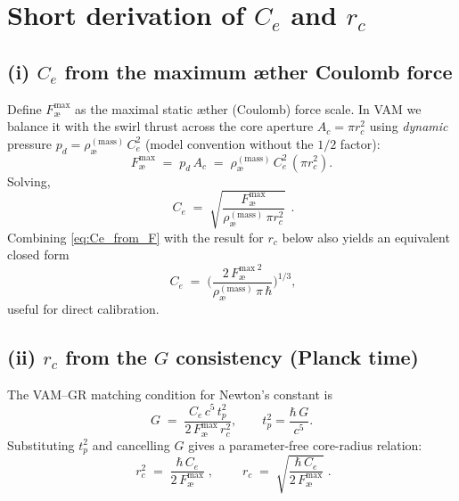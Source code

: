\documentclass[12pt]{article}
\newcommand{\aeRhoM}{\rho_{\text{\ae}}^{(\text{mass})}}
\newcommand{\Ce}{C_e}
\newcommand{\rc}{r_c}
\begin{document}
    \section{Short derivation of \texorpdfstring{\(\Ce\)}{Ce} and \texorpdfstring{\(\rc\)}{rc}}
    \subsection*{(i) \(\Ce\) from the maximum æther Coulomb force}
    Define \(F_{\text{\ae}}^{\max}\) as the maximal static æther (Coulomb) force scale. In VAM we balance it with the swirl thrust across the core aperture \(A_c=\pi \rc^2\) using \emph{dynamic} pressure \(p_d=\aeRhoM\,\Ce^2\) (model convention without the \(1/2\) factor):
    \begin{equation}
        F_{\text{\ae}}^{\max} \;=\; p_d\,A_c \;=\; \aeRhoM\,\Ce^2\,(\pi \rc^2).
    \end{equation}
    Solving,
    \begin{equation}
        \boxed{\;\Ce \;=\; \sqrt{\frac{F_{\text{\ae}}^{\max}}{\aeRhoM\,\pi \rc^2}}\;}\,.
        \label{eq:Ce_from_F}
    \end{equation}
    Combining \eqref{eq:Ce_from_F} with the result for \(\rc\) below also yields an equivalent closed form
    \begin{equation}
        \boxed{\;\Ce \;=\;\Big(\frac{2\,{F_{\text{\ae}}^{\max}}^{\,2}}{\aeRhoM\,\pi\,\hbar}\Big)^{\!1/3}}\!,
    \end{equation}
    useful for direct calibration.

    \subsection*{(ii) \(\rc\) from the \(G\) consistency (Planck time)}
    The VAM--GR matching condition for Newton's constant is \cite[and VAM notes]{Madelung1927,Barcelo2011}
    \begin{equation}
        G \;=\; \frac{\Ce\,c^5\,t_p^2}{2\,F_{\text{\ae}}^{\max}\,\rc^2},
        \qquad t_p^2=\frac{\hbar\,G}{c^5}.
    \end{equation}
    Substituting \(t_p^2\) and cancelling \(G\) gives a parameter-free core-radius relation:
    \begin{equation}
        \boxed{\;\rc^2 \;=\; \frac{\hbar\,\Ce}{2\,F_{\text{\ae}}^{\max}}\;},\qquad
        \boxed{\;\rc \;=\; \sqrt{\frac{\hbar\,\Ce}{2\,F_{\text{\ae}}^{\max}}}\;}.
        \label{eq:rc_from_F}
    \end{equation}
\end{document}
